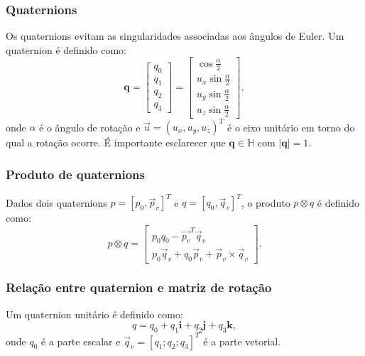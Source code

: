 \subsubsection{Quaternions}
\label{sec:Quaternions}
Os quaternions
evitam as singularidades associadas aos ângulos de Euler.
Um quaternion é definido como:
\begin{equation}
    \label{eq:quaternion_unitario_definicao}
\mathbf{q}
=
\begin{bmatrix}
q_0 \\ q_1 \\ q_2 \\ q_3
\end{bmatrix}
=
\begin{bmatrix}
\cos\frac{\alpha}{2} \\
u_x \sin\frac{\alpha}{2} \\
u_y \sin\frac{\alpha}{2} \\
u_z \sin\frac{\alpha}{2}
\end{bmatrix},
\end{equation}
onde $\alpha$ é o ângulo de rotação e $\vec{u} = (u_x,u_y,u_z)^T$ é o eixo unitário em torno do qual a rotação ocorre.
É importante esclarecer que
$\mathbf{q}\in\mathbb{H}$ com $|\mathbf{q}|=1$.

\subsubsection{Produto de quaternions}
Dados dois quaternions
$p = [p_0,\vec{p}_v]^T$ e $q = [q_0,\vec{q}_v]^T$, 
o produto $p \otimes q$ é definido como:
\begin{equation}
p \otimes q
=
\begin{bmatrix}
p_0 q_0 - \vec{p_v}^{T}\vec{q}_v \\
p_0 \vec{q}_v + q_0 \vec{p}_v + \vec{p}_v \times \vec{q}_v
\end{bmatrix}.
\label{eq:quat_produto}
\end{equation}

\subsubsection{Relação entre quaternion e matriz de rotação}
Um quaternion unitário é definido como:
\begin{equation}
q = q_0
+ q_1 \mathbf{i}
+ q_2\mathbf{j}
+ q_3\mathbf{k},
\label{eq:def_quaternion}
\end{equation}
onde $q_0$ é a parte escalar e $\vec{q}_v = [q_1; q_2; q_3]^T$ é a parte vetorial.  

